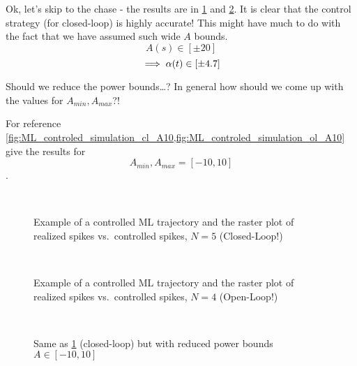 \documentclass{article}
\begin{document}
Ok, let's skip to the chase - the results are in
\cref{fig:ML_controled_simulation_cl} and \cref{fig:ML_controled_simulation_ol}.
It is clear that the control strategy (for closed-loop) is highly accurate! This
might have much to do with the fact that we have assumed such wide $A$ bounds.
$$A(s) \in [\pm 20]$$ $$\implies {\alpha}(t) \in [\pm 4.7]$$


Should we reduce the power bounds\ldots? In general how should we come up with
the values for $A_{min}, A_{max}$?!

For reference
\cref{fig:ML_controled_simulation_cl_A10,fig:ML_controled_simulation_ol_A10}
give the results for $$A_{min}, A_{max} = [-10,10]$$.

\begin{figure}[h]
\begin{center}
\\
\caption[labelInTOC]{Example of a controlled ML trajectory and the raster plot
of realized spikes vs.\ controlled spikes, $N=5$ 	(Closed-Loop!)}
\label{fig:ML_controled_simulation_cl}
\end{center} 
\end{figure}
\begin{figure}[h] 
\begin{center}
\\
\caption[labelInTOC]{Example of a controlled ML trajectory and the raster plot
of realized spikes vs.\ controlled spikes, $N=4$ 	(Open-Loop!)}
\label{fig:ML_controled_simulation_ol}
\end{center} 
\end{figure}
\begin{figure}[h]
\begin{center}
\\
\caption[labelInTOC]{Same as \cref{fig:ML_controled_simulation_cl}
(closed-loop) but with reduced power bounds $A \in [-10,10]$}
\label{fig:ML_controled_simulation_cl_A10} 
\end{center}
\end{figure}
\end{document}
